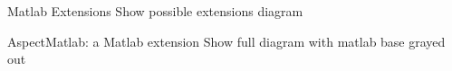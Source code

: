 \begin{frame}{Matlab Extensions}
  Show possible extensions diagram
\end{frame}
\begin{frame}{AspectMatlab: a Matlab extension}
  Show full diagram with matlab base grayed out
\end{frame}

